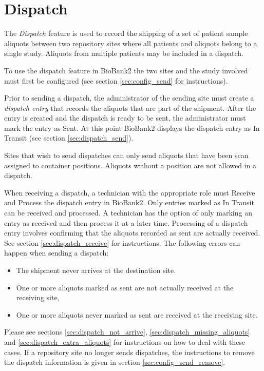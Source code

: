 \chapter{Dispatch}
The \emph{Dispatch} feature is used to record the shipping of a set of patient
sample aliquots between two repository sites where all patients and aliquots
belong to a single study.  Aliquots from multiple patients may be included in a
dispatch.

To use the dispatch feature in BioBank2 the two sites and the study involved
must first be configured (see section \ref{sec:config_send} for instructions).

Prior to sending a dispatch, the administrator of the sending site must create
a \emph{dispatch entry} that records the aliquots that are part of the
shipment. After the entry is created and the dispatch is ready to be sent, the
administrator must mark the entry as Sent. At this point BioBank2 displays the
dispatch entry as In Transit (see section \ref{sec:dispatch_send}).

Sites that wish to send dispatches can only send aliquots that have been scan
assigned to container positions. Aliquots without a position are not allowed in
a dispatch.

When receiving a dispatch, a technician with the appropriate role must Receive
and Process the dispatch entry in BioBank2. Only entries marked as In Transit
can be received and processed. A technician has the option of only marking an
entry as received and then process it at a later time. Processing of a dispatch
entry involves confirming that the aliquots recorded as sent are actually
received. See section \ref{sec:dispatch_receive} for instructions.  The
following errors can happen when sending a dispatch:
\begin{itemize}
  \item The shipment never arrives at the destination site.
  \item One or more aliquots marked as sent are not actually received at the
    receiving site,
  \item One or more aliquots never marked as sent are received at the receiving
    site.
\end{itemize}
Please see sections \ref{sec:dispatch_not_arrive},
\ref{sec:dispatch_missing_aliquots} and \ref{sec:dispatch_extra_aliquots} for
instructions on how to deal with these cases.  If a repository site no longer
sends dispatches, the instructions to remove the dispatch information is given
in section \ref{sec:config_send_remove}.
